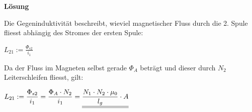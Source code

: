 \newpage

\beginip
\textbf{Lösung}

Die Gegeninduktivität beschreibt, wieviel magnetischer Fluss durch die 2. Spule fliesst abhängig des Stromes der ersten Spule:
\begin{center}
$\displaystyle L_{21} := \frac{\Phi_{s2}}{i_1}$
\end{center}

Da der Fluss im Magneten selbst gerade $\Phi_A$ beträgt und dieser durch $N_2$ Leiterschleifen fliesst, gilt:
\begin{center}

	$\displaystyle  L_{21} := \frac{\Phi_{s2}}{i_1} = \frac{\Phi_A \cdot N_2}{i_1} = \underline{\underline{\frac{N_1\cdot N_2 \cdot \mu_0}{l_g} \cdot A}}$
\end{center}
\iend






